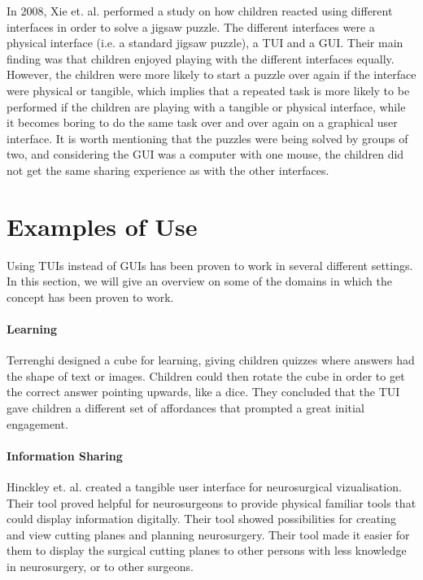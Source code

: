In 2008, Xie et. al. performed a study on how children reacted using different interfaces in order to solve a jigsaw puzzle\cite{xie2008tangibles}. The different interfaces were a physical interface (i.e. a standard jigsaw puzzle), a TUI and a GUI. Their main finding was that children enjoyed playing with the different interfaces equally. However, the children were more likely to start a puzzle over again if the interface were physical or tangible, which implies that a repeated task is more likely to be performed if the children are playing with a tangible or physical interface, while it becomes boring to do the same task over and over again on a graphical user interface. It is worth mentioning that the puzzles were being solved by groups of two, and considering the GUI was a computer with one mouse, the children did not get the same sharing experience as with the other interfaces. 


\section{Examples of Use}
\label{sec:tuiexamples}
Using TUIs instead of GUIs has been proven to work in several different settings. In this section, we will give an overview on some of the domains in which the concept has been proven to work. 

\paragraph{Learning} \newline
Terrenghi \etal{} designed a cube for learning, giving children quizzes where answers had the shape of text or images\cite{terrenghi2006cube}. Children could then rotate the cube in order to get the correct answer pointing upwards, like a dice. They concluded that the TUI gave children a different set of affordances that prompted a great initial engagement\cite{terrenghi2006cube}. 

\paragraph{Information Sharing} \newline
Hinckley et. al. created a tangible user interface for neurosurgical vizualisation\cite{hinckley1994passive}. Their tool proved helpful for neurosurgeons to provide physical familiar tools that could display information digitally. Their tool showed possibilities for creating and view cutting planes and planning neurosurgery. Their tool made it easier for them to display the surgical cutting planes to other persons with less knowledge in neurosurgery, or to other surgeons. 


